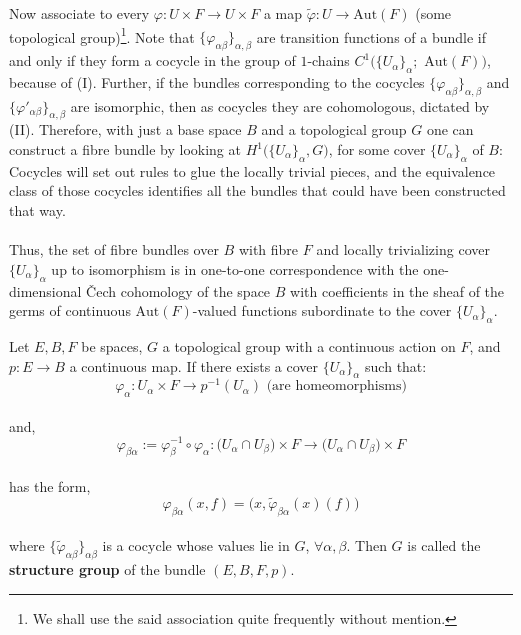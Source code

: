 \documentclass[11pt,a4paper]{article}
\begin{document}
Now associate to every $\varphi:U\times F \rightarrow U\times F$ a map $\widetilde{\varphi}: U \rightarrow \text{Aut}(F)$ (some topological group)\footnote{We shall use the said association quite frequently without mention.}. Note that $\{\varphi_{\alpha\beta}\}_{\alpha, \beta}$ are transition functions of a bundle if and only if they form a cocycle in the group of $1$-chains $C^{1}\big(\{U_{\alpha}\}_{\alpha}; \text{ Aut}(F)\big)$, because of (I). Further, if the bundles corresponding to the cocycles $\{\varphi_{\alpha\beta}\}_{\alpha, \beta}$ and $\{\varphi'_{\alpha\beta}\}_{\alpha, \beta}$ are isomorphic, then as cocycles they are cohomologous, dictated by (II). Therefore, with just a base space $B$ and a topological group $G$ one can construct a fibre bundle by looking at $H^{1}\big(\{U_{\alpha}\}_{\alpha
}, G\big)$, for some cover $\{U_{\alpha}\}_{\alpha
}$ of $B$: Cocycles will set out rules to glue the locally trivial pieces, and the equivalence class of those cocycles identifies all the bundles that could have been constructed that way.\\\\
Thus, the set of fibre bundles over $B$ with fibre $F$ and locally trivializing cover $\{U_{\alpha}\}_{\alpha}$ up to isomorphism is in one-to-one correspondence with the one-dimensional \v{C}ech cohomology of the space $B$ with coefficients in the sheaf of the germs of continuous $\text{Aut}(F)$-valued functions subordinate to the cover $\{U_{\alpha}\}_{\alpha}$.\\
\begin{definition}
Let $E, B, F$ be spaces, $G$ a topological group with a continuous action on $F$, and $p: E\rightarrow B$ a continuous map. If there exists a cover $\{U_{\alpha}\}_{\alpha}$ such that:
$$\varphi_{\alpha}: U_{\alpha}\times F \rightarrow p^{-1}(U_{\alpha}) \text{ (are homeomorphisms)}$$\\
and,
$$\varphi_{\beta\alpha} := \varphi_{\beta}^{-1}\circ\varphi_{\alpha}: \big(U_{\alpha}\cap U_{\beta}\big) \times F \rightarrow \big(U_{\alpha}\cap U_{\beta}\big) \times F$$\\
has the form,
$$\varphi_{\beta\alpha}(x, f) = \big(x, \widetilde{\varphi}_{\beta\alpha}(x)(f)\big)$$\\
where $\{\widetilde{\varphi}_{\alpha\beta}\}_{\alpha\beta}$ is a cocycle whose values lie in $G$, $\forall \alpha, \beta$. Then $G$ is called the \textbf{structure group} of the bundle $(E, B, F, p)$.
\end{definition}
\end{document}
